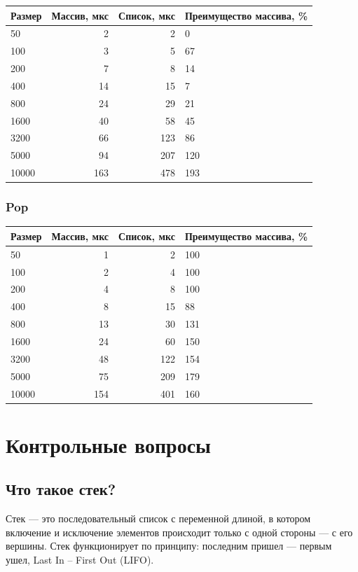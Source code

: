 \documentclass[a4paper,12pt]{extarticle}
\begin{document}
\begin{tabular}{ |l|r|r|l| }
\hline
\textbf{Размер}  & \textbf{Массив, мкс} & \textbf{Список, мкс} & \textbf{Преимущество массива, \%} \\ \hline

50 & 2 & 2 & 0 \\ \hline
100 & 3 & 5 & 67 \\ \hline
200 & 7 & 8 & 14 \\ \hline
400 & 14 & 15 & 7 \\ \hline
800 & 24 & 29 & 21 \\ \hline
1600 & 40 & 58 & 45 \\ \hline
3200 & 66 & 123 & 86 \\ \hline
5000 & 94 & 207 & 120 \\ \hline
10000 & 163 & 478 & 193 \\ \hline

\end{tabular}

\subsubsection{Pop}

\begin{tabular}{ |l|r|r|l| }
\hline
\textbf{Размер}  & \textbf{Массив, мкс} & \textbf{Список, мкс} & \textbf{Преимущество массива, \%} \\ \hline

50 & 1 & 2 & 100 \\ \hline
100 & 2 & 4 & 100 \\ \hline
200 & 4 & 8 & 100 \\ \hline
400 & 8 & 15 & 88 \\ \hline
800 & 13 & 30 & 131 \\ \hline
1600 & 24 & 60 & 150 \\ \hline
3200 & 48 & 122 & 154 \\ \hline
5000 & 75 & 209 & 179 \\ \hline
10000 & 154 & 401 & 160 \\ \hline

\end{tabular}

\newpage


\section{Контрольные вопросы}
\subsection{Что такое стек?}
Стек --- это последовательный список с переменной длиной, в котором включение и исключение элементов происходит только с одной стороны --- с его вершины. Стек функционирует по принципу: последним пришел --- первым ушел, Last In – First Out (LIFO).
\end{document}
